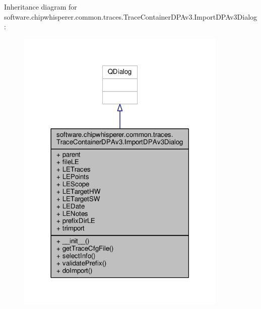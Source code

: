 Inheritance diagram for software.\+chipwhisperer.\+common.\+traces.\+Trace\+Container\+D\+P\+Av3.\+Import\+D\+P\+Av3\+Dialog\+:\nopagebreak
\begin{figure}[H]
\begin{center}
\leavevmode
\includegraphics[width=285pt]{de/da6/classsoftware_1_1chipwhisperer_1_1common_1_1traces_1_1TraceContainerDPAv3_1_1ImportDPAv3Dialog__inherit__graph}
\end{center}
\end{figure}


